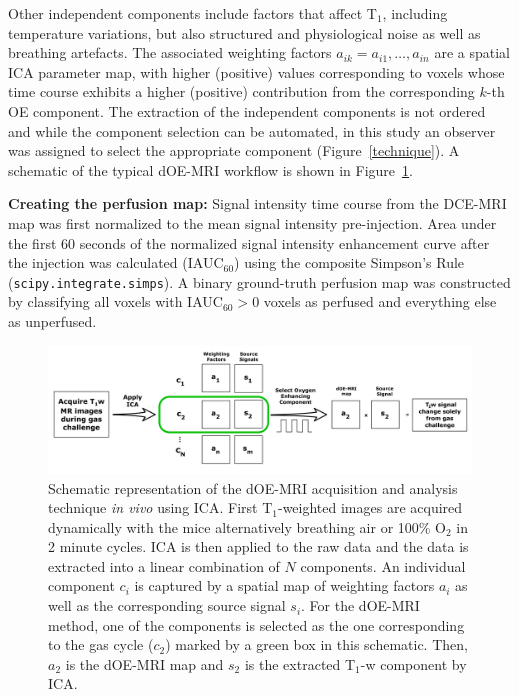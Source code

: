 Other independent components include factors that affect T$_1$, including temperature variations, but also structured and physiological noise as well as breathing artefacts.
The associated weighting factors $a_{ik}=a_{i1},\ldots,a_{in}$ are a spatial ICA parameter map, with higher (positive) values corresponding to voxels whose time course exhibits a higher (positive) contribution from the corresponding $k$-th OE component.
The extraction of the independent components is not ordered and while the component selection can be automated, in this study an observer was assigned to select the appropriate component (Figure~\ref{technique}).
A schematic of the typical dOE-MRI workflow is shown in Figure~\ref{workflow}.

\noindent\textbf{Creating the perfusion map:} Signal intensity time course from the DCE-MRI map was first normalized to the mean signal intensity pre-injection.
Area under the first 60 seconds of the normalized signal intensity enhancement curve after the injection was calculated (IAUC$_{60}$) using the composite Simpson's Rule (\texttt{scipy.integrate.simps}).
A binary ground-truth perfusion map was constructed by classifying all voxels with IAUC$_{60} > 0$ voxels as perfused and everything else as unperfused.

\begin{figure}[htbp]
   \centering
   \includegraphics[width=\textwidth]{oemri/oemri-images/oemri_workflow.png} %
   \caption{Schematic representation of the dOE-MRI acquisition and analysis technique \textit{in vivo} using ICA.
First T$_1$-weighted images are acquired dynamically with the mice alternatively breathing air or 100\% O$_2$ in 2 minute cycles.
ICA is then applied to the raw data and the data is extracted into a linear combination of $N$ components.
An individual component $c_i$ is captured by a spatial map of weighting factors $a_i$ as well as the corresponding source signal $s_i$.
For the dOE-MRI method, one of the components is selected as the one corresponding to the gas cycle ($c_2$) marked by a green box in this schematic.
Then, $a_2$ is the dOE-MRI map and $s_2$ is the extracted T$_1$-w component by ICA.}
   \label{workflow}
\end{figure}

